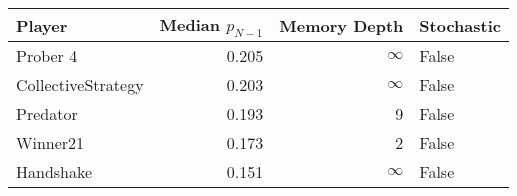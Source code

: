 \begin{tabular}{lrrl}
\toprule
             Player &  Median $p_{N-1}$ &  Memory Depth & Stochastic \\
\midrule
           Prober 4 &             0.205 &            \(\infty\) &      False \\
 CollectiveStrategy &             0.203 &            \(\infty\) &      False \\
           Predator &             0.193 &             9 &      False \\
           Winner21 &             0.173 &             2 &      False \\
          Handshake &             0.151 &            \(\infty\) &      False \\
\bottomrule
\end{tabular}
